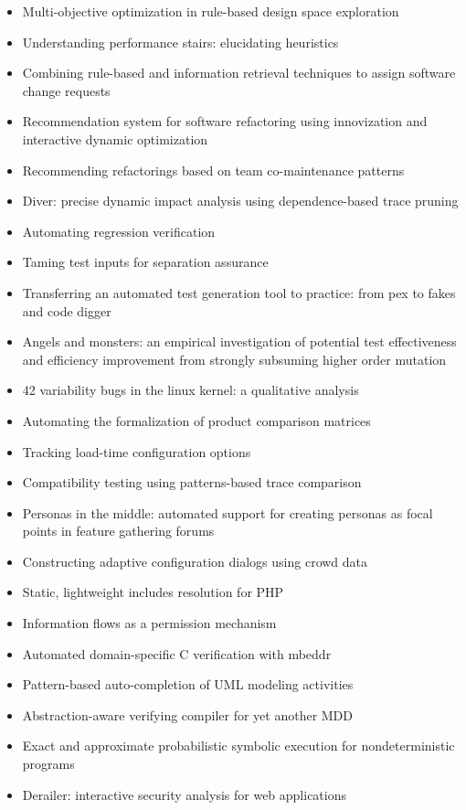 {\begin{itemize}[itemsep=-1ex]
  \item Multi-objective optimization in rule-based design space exploration
  \item Understanding performance stairs: elucidating heuristics
  \item Combining rule-based and information retrieval techniques to assign software change requests
  \item Recommendation system for software refactoring using innovization and interactive dynamic optimization
  \item Recommending refactorings based on team co-maintenance patterns
  \item Diver: precise dynamic impact analysis using dependence-based trace pruning
  \item Automating regression verification
  \item Taming test inputs for separation assurance
  \item Transferring an automated test generation tool to practice: from pex to fakes and code digger
  \item Angels and monsters: an empirical investigation of potential test effectiveness and efficiency improvement from strongly subsuming higher order mutation
  \item 42 variability bugs in the linux kernel: a qualitative analysis
  \item Automating the formalization of product comparison matrices
  \item Tracking load-time configuration options
  \item Compatibility testing using patterns-based trace comparison
  \item Personas in the middle: automated support for creating personas as focal points in feature gathering forums
  \item Constructing adaptive configuration dialogs using crowd data
  \item Static, lightweight includes resolution for PHP
  \item Information flows as a permission mechanism
  \item Automated domain-specific C verification with mbeddr
  \item Pattern-based auto-completion of UML modeling activities
  \item Abstraction-aware verifying compiler for yet another MDD
  \item Exact and approximate probabilistic symbolic execution for nondeterministic programs
  \item Derailer: interactive security analysis for web applications

\end{itemize}}
